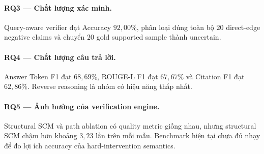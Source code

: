 \paragraph{RQ3 --- Chất lượng xác minh.}

Query-aware verifier đạt Accuracy \(92{,}00\%\), phân loại đúng toàn bộ
\(20\) direct-edge negative claims và chuyển \(20\) gold supported sample
thành uncertain.

\paragraph{RQ4 --- Chất lượng câu trả lời.}

Answer Token F1 đạt \(68{,}69\%\), ROUGE-L F1 đạt \(67{,}67\%\) và Citation
F1 đạt \(62{,}86\%\). Reverse reasoning là nhóm có hiệu năng thấp nhất.

\paragraph{RQ5 --- Ảnh hưởng của verification engine.}

Structural SCM và path ablation có quality metric giống nhau, nhưng
structural SCM chậm hơn khoảng \(3{,}23\) lần trên mỗi mẫu. Benchmark hiện
tại chưa đủ nhạy để đo lợi ích accuracy của hard-intervention semantics.
